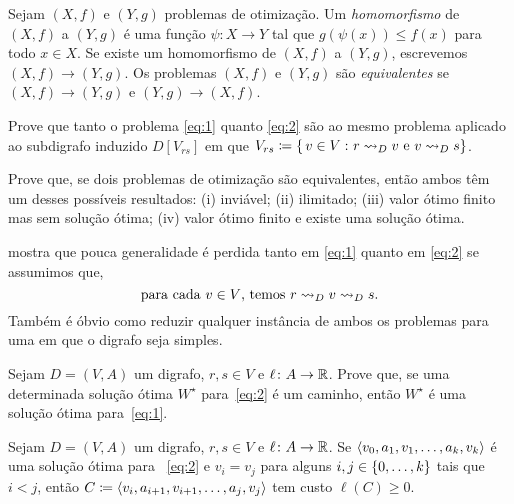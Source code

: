 \documentclass[10pt,reqno]{amsart}
\begin{document}
\begin{definition*}
  Sejam \((X,f)\) e \((Y,g)\) problemas de otimização.  Um
  \emph{homomorfismo} de \((X,f)\) a \((Y,g)\) é uma função
  \(\psi \colon X \to Y\) tal que \(g(\psi(x)) \leq f(x)\) para todo
  \(x \in X\).  Se existe um homomorfismo de \((X,f)\) a
  \((Y,g)\), escrevemos \((X,f) \to (Y,g)\).  Os problemas \((X,f)\) e
  \((Y,g)\) são \emph{equivalentes} se \((X,f) \to (Y,g)\) e
  \((Y,g) \to (X,f)\).
\end{definition*}

\begin{exercise}
  \label{ex:1}
  Prove que tanto o problema \eqref{eq:1} quanto \eqref{eq:2} são     
  ao mesmo problema aplicado ao subdigrafo induzido \(D[V_{rs}]\)
  em que
  \(V_{rs} \coloneqq \{\,{v \in V}\,\colon{r \rightsquigarrow_D v \text{ e }v
    \rightsquigarrow_D s}\}\).
\end{exercise}

\begin{exercise}
  Prove que, se dois problemas de otimização são equivalentes, então
  ambos têm um desses possíveis resultados: (i) inviável; (ii) ilimitado;
  (iii) valor ótimo finito mas sem solução ótima; (iv) valor ótimo finito
  e existe uma solução ótima.
\end{exercise}

 mostra que pouca generalidade é perdida tanto em
\eqref{eq:1} quanto em \eqref{eq:2} se assumimos que,
\begin{equation}
  \label{eq:3}
  \text{para cada \(v \in V\), temos \(r \rightsquigarrow_D v \rightsquigarrow_D s\).}
\end{equation}
Também é óbvio como reduzir qualquer instância de ambos os problemas para 
uma em que o digrafo seja simples.

\begin{exercise}
  \label{ex:2}
  Sejam \(D = (V,A)\) um digrafo, \(r,s \in V\) e
  \(\ell \colon A \to \mathbb{R}\).  Prove que, se uma determinada solução
  ótima \(W^\star\) para~\eqref{eq:2} é um caminho, então \(W^\star\) é uma
  solução ótima para~\eqref{eq:1}.
\end{exercise}

\begin{exercise}
  \label{ex:3}
  Sejam \(D = (V,A)\) um digrafo, \(r,s \in V\) e
  \(\ell \colon A \to \mathbb{R}\).  Se
  \(\langle v_0,a_1,v_1,\dotsc,a_k,v_k\rangle\) é uma solução ótima para
  ~\eqref{eq:2} e \(v_i = v_j\) para alguns
  \(i,j \in \{0,\dotsc,k\}\) tais que \(i < j\), então
  \(C \coloneqq \langle v_i,a_{i+1},v_{i+1},\dotsc,a_j,v_j\rangle\) tem custo
  \(\ell(C) \geq 0\).
\end{exercise}
\end{document}

